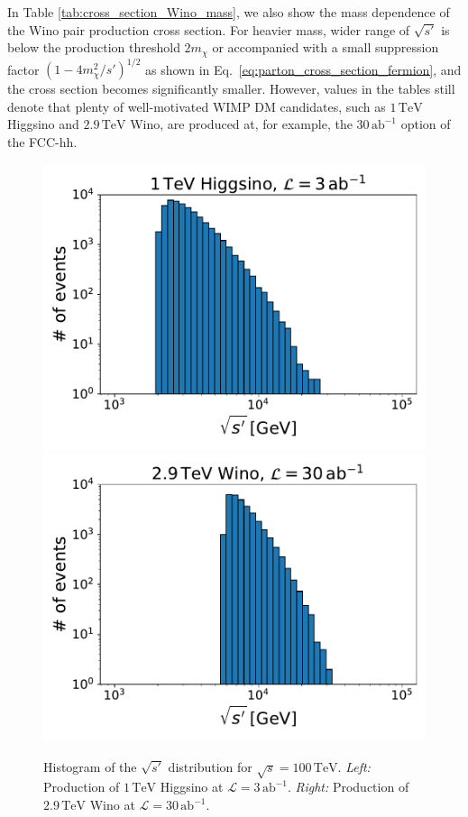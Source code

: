 \documentclass[12pt,twoside,book]{article}
\begin{document}
In Table \ref{tab:cross_section_Wino_mass}, we also show the mass dependence of the Wino pair production cross section.
For heavier mass, wider range of $\sqrt{s'}$ is below the production threshold $2 m_{\chi}$ or accompanied with a small suppression factor $(1-4 m_\chi^2 / s')^{1/2}$ as shown in Eq.~\eqref{eq:parton_cross_section_fermion}, and the cross section becomes significantly smaller.
However, values in the tables still denote that plenty of well-motivated WIMP DM candidates, such as $1\,\mathrm{TeV}$ Higgsino and $2.9\,\mathrm{TeV}$ Wino, are produced at, for example, the $30\,\mathrm{ab}^{-1}$ option of the FCC-hh.

\begin{figure}[t]
  \centering
  \includegraphics[width=0.48\hsize]{invariant_mass_Higgsino.pdf}
  \includegraphics[width=0.48\hsize]{invariant_mass_Wino.pdf}
  \caption{
    Histogram of the $\sqrt{s'}$ distribution for $\sqrt{s} = 100\,\mathrm{TeV}$.
    \textit{Left:} Production of $1\,\mathrm{TeV}$ Higgsino at $\mathcal{L} = 3\,\mathrm{ab}^{-1}$.
    \textit{Right:} Production of $2.9\,\mathrm{TeV}$ Wino at $\mathcal{L} = 30\,\mathrm{ab}^{-1}$.}
  \label{fig:invariant_mass}
\end{figure}
\end{document}
